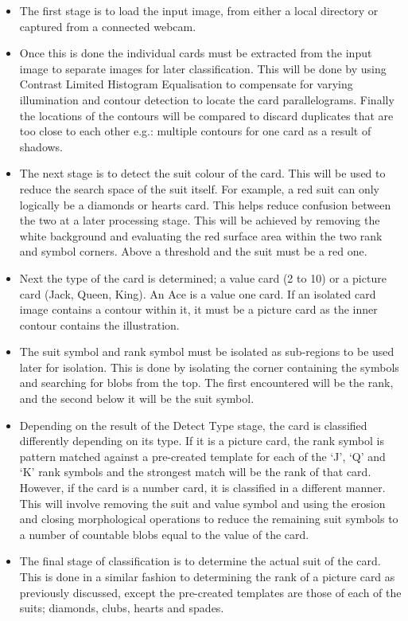 \documentclass[a4paper,12pt,notitlepage]{article}
\begin{document}
		\begin{itemize}
			\item The first stage is to load the input image, from either a local directory or captured from a connected webcam. 
			\item Once this is done the individual cards must be extracted from the input image to separate images for later classification. This will be done by using Contrast Limited Histogram Equalisation to compensate for varying illumination and contour detection to locate the card parallelograms. Finally the locations of the contours will be compared to discard duplicates that are too close to each other e.g.: multiple contours for one card as a result of shadows.
			\item The next stage is to detect the suit colour of the card. This will be used to reduce the search space of the suit itself. For example, a red suit can only logically be a diamonds or hearts card. This helps reduce confusion between the two at a later processing stage. This will be achieved by removing the white background and evaluating the red surface area within the two rank and symbol corners. Above a threshold and the suit must be a red one.
			\item Next the type of the card is determined; a value card (2 to 10) or a picture card (Jack, Queen, King). An Ace is a value one card. If an isolated card image contains a contour within it, it must be a picture card as the inner contour contains the illustration. 
			\item The suit symbol and rank symbol must be isolated as sub-regions to be used later for isolation. This is done by isolating the corner containing the symbols and searching for blobs from the top. The first encountered will be the rank, and the second below it will be the suit symbol.
			\item Depending on the result of the Detect Type stage, the card is classified differently depending on its type.  If it is a picture card, the rank symbol is pattern matched against a pre-created template for each of the `J', `Q' and `K' rank symbols and the strongest match will be the rank of that card. However, if the card is a number card, it is classified in a different manner. This will involve removing the suit and value symbol and using the erosion and closing morphological operations to reduce the remaining suit symbols to a number of countable blobs equal to the value of the card. 
			\item The final stage of classification is to determine the actual suit of the card. This is done in a similar fashion to determining the rank of a picture card as previously discussed, except the pre-created templates are those of each of the suits; diamonds, clubs, hearts and spades.
		\end{itemize}
\pagebreak
\end{document}
